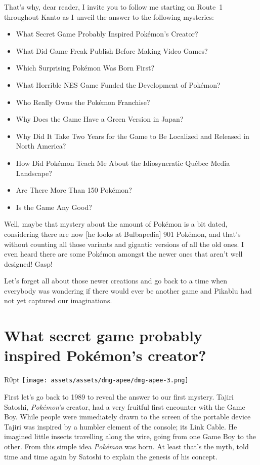 \documentclass{book}
\begin{document}
That’s why, dear reader, I invite you to follow me starting on Route 1 throughout Kanto as I unveil the answer to the following mysteries:

\begin{itemize} \setlength\itemsep{-0.4em}
\item What Secret Game Probably Inspired Pokémon’s Creator?
\item What Did Game Freak Publish Before Making Video Games?
\item Which Surprising Pokémon Was Born First?
\item What Horrible NES Game Funded the Development of Pokémon?
\item Who Really Owns the Pokémon Franchise?
\item Why Does the Game Have a Green Version in Japan?
\item Why Did It Take Two Years for the Game to Be Localized and Released in North America?
\item How Did Pokémon Teach Me About the Idiosyncratic Québec Media Landscape?
\item Are There More Than 150 Pokémon?
\item Is the Game Any Good?
\end{itemize}\noindent

Well, maybe that mystery about the amount of Pokémon is a bit dated, considering there are now [he looks at Bulbapedia] 901 Pokémon, and that’s without counting all those variants and gigantic versions of all the old ones. I even heard there are some Pokémon amongst the newer ones that aren’t well designed! Gasp!

Let’s forget all about those newer creations and go back to a time when everybody was wondering if there would ever be another game and Pikablu had not yet captured our imaginations.

\FloatBarrier\needspace{5pt}\section*{What secret game probably inspired Pokémon’s creator?}\nopagebreak[4]
\begin{wrapfigure}{R}{0pt} \texttt{[image: assets/assets/dmg-apee/dmg-apee-3.png]}\end{wrapfigure}
First let’s go back to 1989 to reveal the answer to our first mystery. Tajiri Satoshi, \emph{Pokémon}’s creator, had a very fruitful first encounter with the Game Boy. While people were immediately drawn to the screen of the portable device Tajiri was inspired by a humbler element of the console; its Link Cable. He imagined little insects travelling along the wire, going from one Game Boy to the other. From this simple idea \emph{Pokémon} was born. At least that’s the myth, told time and time again by Satoshi to explain the genesis of his concept.
\end{document}
